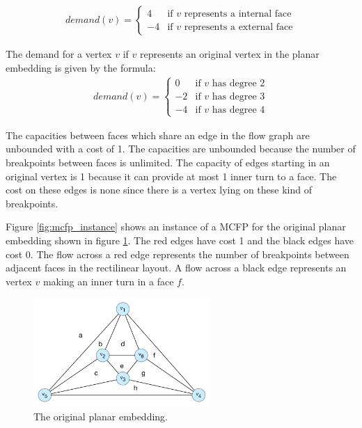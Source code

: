 \documentclass[12pt]{article}
\begin{document}
\begin{align*}
    demand(v) = \begin{cases}
                  4  & \text{if } v \text{ represents a internal face}\\
                  -4 & \text{if } v \text{ represents a external face}
                \end{cases}
\end{align*}

The demand for a vertex $v$ if $v$ represents an original vertex in the planar embedding is given by the formula:
\begin{align*}
    demand(v) = \begin{cases}
                  0  & \text{if } v \text{ has degree 2} \\
                  -2 & \text{if } v \text{ has degree 3} \\
                  -4 & \text{if } v \text{ has degree 4}
                \end{cases}
\end{align*}

The capacities between faces which share an edge in the flow graph are unbounded with a cost of 1. The capacities are unbounded because the number of breakpoints between faces is unlimited. The capacity of edges starting in an original vertex is 1 because it can provide at most 1 inner turn to a face. The cost on these edges is none since there is a vertex lying on these kind of breakpoints.

Figure \ref{fig:mcfp_instance} shows an instance of a MCFP for the original planar embedding shown in figure \ref{fig:planar_embedding}. The red edges have cost 1 and the black edges have cost 0. The flow across a red edge represents the number of breakpoints between adjacent faces in the rectilinear layout. A flow across a black edge represents an vertex $v$ making an inner turn in a face $f$.

\begin{figure}[h]
  \centering
    \includegraphics[width=0.6\textwidth]{figures/e2_5_planar_embedding}
  \caption{The original planar embedding.}
  \label{fig:planar_embedding}
\end{figure}
\end{document}
